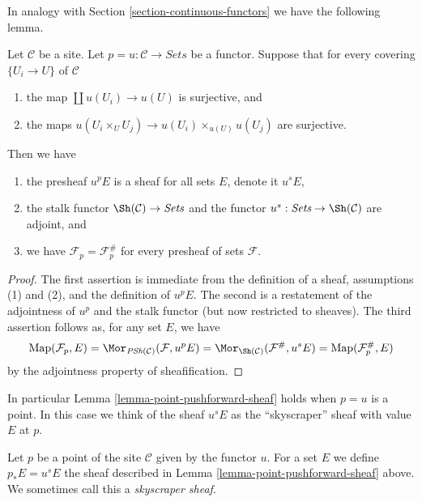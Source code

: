 \noindent
In analogy with Section \ref{section-continuous-functors}
we have the following lemma.

\begin{lemma}
\label{lemma-point-pushforward-sheaf}
Let $\mathcal{C}$ be a site. Let $p = u : \mathcal{C} \to \textit{Sets}$
be a functor. Suppose that for every covering $\{U_i \to U\}$ of $\mathcal{C}$
\begin{enumerate}
\item the map $\coprod u(U_i) \to u(U)$ is surjective, and
\item the maps
$u(U_i \times_U U_j) \to u(U_i) \times_{u(U)} u(U_j)$ are surjective.
\end{enumerate}
Then we have
\begin{enumerate}
\item the presheaf $u^pE$ is a sheaf for all sets $E$, denote it $u^sE$,
\item the stalk functor $\Sh(\mathcal{C}) \to \textit{Sets}$
and the functor $u^s: \textit{Sets} \to \Sh(\mathcal{C})$ are
adjoint, and
\item we have $\mathcal{F}_p = \mathcal{F}^\#_p$
for every presheaf of sets $\mathcal{F}$.
\end{enumerate}
\end{lemma}

\begin{proof}
The first assertion is immediate from the definition of a sheaf, assumptions
(1) and (2), and the definition of $u^pE$. The second is a restatement of the
adjointness of $u^p$ and the stalk functor (but now restricted to sheaves).
The third assertion follows as, for any set $E$, we have
$$
\text{Map}(\mathcal{F}_p, E) =
\Mor_{\textit{PSh}(\mathcal{C})}(\mathcal{F}, u^pE) =
\Mor_{\Sh(\mathcal{C})}(\mathcal{F}^\#, u^sE) =
\text{Map}(\mathcal{F}^\#_p, E)
$$
by the adjointness property of sheafification.
\end{proof}

\noindent
In particular Lemma \ref{lemma-point-pushforward-sheaf}
holds when $p = u$ is a point. In this case we think of the
sheaf $u^sE$ as the ``skyscraper'' sheaf with value $E$ at $p$.

\begin{definition}
\label{definition-pushforward-point}
Let $p$ be a point of the site $\mathcal{C}$ given by the functor $u$.
For a set $E$ we define $p_*E = u^sE$ the sheaf
described in Lemma \ref{lemma-point-pushforward-sheaf} above.
We sometimes call this a {\it skyscraper sheaf}.
\end{definition}

